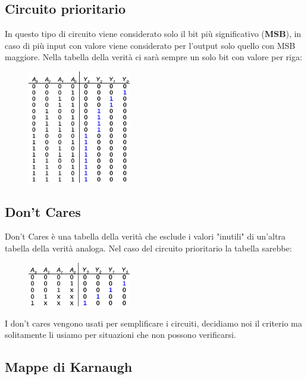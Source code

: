 \documentclass[../main.tex]{subfiles}
\begin{document}
\pagebreak
\subsection{Circuito prioritario}
In questo tipo di circuito viene considerato solo il bit più significativo (\textbf{MSB}), in caso di più input con valore 
viene considerato per l'output solo quello con MSB maggiore. Nella tabella della verità ci sarà sempre un solo 
bit con valore  per riga:
\begin{figure}[h]
    \centering
    \includegraphics[width=0.4\textwidth]{images/circuitoPrioritario.png}
\end{figure}

\subsection{Don't Cares}
Don't Cares è una tabella della verità che esclude i valori "inutili" di un'altra tabella della verità analoga. Nel caso del circuito
prioritario la tabella sarebbe:
\begin{figure}[h]
    \centering
    \includegraphics[width=0.4\textwidth]{images/dontCares.png}
\end{figure}

I don't cares vengono usati per semplificare i circuiti, decidiamo noi il criterio ma solitamente li usiamo per situazioni che non
possono verificarsi.

\pagebreak
\subsection{Mappe di Karnaugh}
\end{document}
